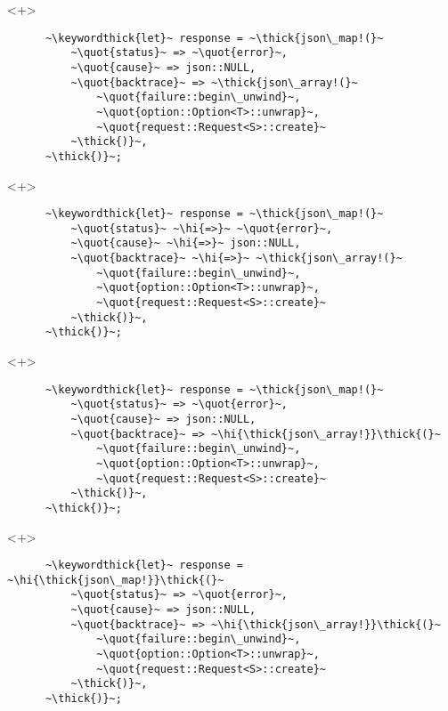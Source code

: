 \documentclass[usepdftitle=false,aspectratio=169]{beamer}
\newcommand{\thick}[1]{\contourlength{0.16pt}\contour[10]{black}{#1}}
\newcommand{\slantbox}[2][.5]
  {%
    \mbox
      {%
        \sbox{\foobox}{#2}%
        \hskip\wd\foobox
        \pdfsave
        \pdfsetmatrix{1 0 #1 1}%
        \llap{\usebox{\foobox}}%
        \pdfrestore
      }%
  }
\newcommand{\backslantbox}[2][.5]
  {%
    \mbox
      {%
        \sbox{\foobox}{#2}%
        \hskip\wd\foobox
        \pdfsave
        \pdfsetmatrix{-1 0 #1 1}%
        \llap{\usebox{\foobox}}%
        \pdfrestore
      }%
  }
\newcommand{\hi}[1]{%
\tikz[baseline=(A.base)]
 \node[highlighting=yellowbg,inner sep=0pt,text depth=0pt] (A) {#1};%
}
\newcommand{\openquote}{\backslantbox[.2]{\hspace{11pt}''\hspace{-11pt}}}
\newcommand{\closequote}{\slantbox[-.2]{\hspace{2pt}''\hspace{-2pt}}}
\newcommand{\blackquote}[1]{\openquote#1\closequote}
\newcommand{\quot}[1]{{\color{redish}\blackquote{#1}}}
\newcommand{\keywordthick}[1]{\color{greenish}\contourlength{0.20pt}\contour[10]{greenish}{#1}}
\begin{document}
\begin{frame}[fragile]
  \begin{onlyenv}<+>
    \begin{verbatim}
      ~\keywordthick{let}~ response = ~\thick{json\_map!(}~
          ~\quot{status}~ => ~\quot{error}~,
          ~\quot{cause}~ => json::NULL,
          ~\quot{backtrace}~ => ~\thick{json\_array!(}~
              ~\quot{failure::begin\_unwind}~,
              ~\quot{option::Option<T>::unwrap}~,
              ~\quot{request::Request<S>::create}~
          ~\thick{)}~,
      ~\thick{)}~;
    \end{verbatim}
  \end{onlyenv}
  \begin{onlyenv}<+>
    \begin{verbatim}
      ~\keywordthick{let}~ response = ~\thick{json\_map!(}~
          ~\quot{status}~ ~\hi{=>}~ ~\quot{error}~,
          ~\quot{cause}~ ~\hi{=>}~ json::NULL,
          ~\quot{backtrace}~ ~\hi{=>}~ ~\thick{json\_array!(}~
              ~\quot{failure::begin\_unwind}~,
              ~\quot{option::Option<T>::unwrap}~,
              ~\quot{request::Request<S>::create}~
          ~\thick{)}~,
      ~\thick{)}~;
    \end{verbatim}
  \end{onlyenv}
  \begin{onlyenv}<+>
    \begin{verbatim}
      ~\keywordthick{let}~ response = ~\thick{json\_map!(}~
          ~\quot{status}~ => ~\quot{error}~,
          ~\quot{cause}~ => json::NULL,
          ~\quot{backtrace}~ => ~\hi{\thick{json\_array!}}\thick{(}~
              ~\quot{failure::begin\_unwind}~,
              ~\quot{option::Option<T>::unwrap}~,
              ~\quot{request::Request<S>::create}~
          ~\thick{)}~,
      ~\thick{)}~;
    \end{verbatim}
  \end{onlyenv}
  \begin{onlyenv}<+>
    \begin{verbatim}
      ~\keywordthick{let}~ response = ~\hi{\thick{json\_map!}}\thick{(}~
          ~\quot{status}~ => ~\quot{error}~,
          ~\quot{cause}~ => json::NULL,
          ~\quot{backtrace}~ => ~\hi{\thick{json\_array!}}\thick{(}~
              ~\quot{failure::begin\_unwind}~,
              ~\quot{option::Option<T>::unwrap}~,
              ~\quot{request::Request<S>::create}~
          ~\thick{)}~,
      ~\thick{)}~;
    \end{verbatim}
  \end{onlyenv}

\end{frame}
\end{document}

